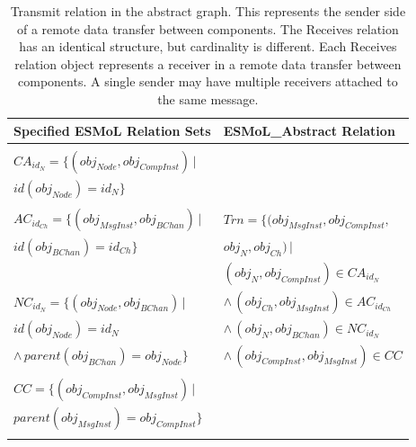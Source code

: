 \begin{table}
\centering

\begin{tabular}[width=0.5\columnwidth]{ | l | l | }
 \hline
 \textbf{Specified ESMoL Relation Sets} & \textbf{ESMoL\_Abstract Relation} \\
 \hline \hline
                                                                        & \\
 $CA_{id_N} = \{ (obj_{Node}, obj_{CompInst} ) \, |$                    & \\
 \hspace{1.7cm} $ id(obj_{Node}) = id_N \} $                            & \\
                                                                        & \\
 $AC_{id_{Ch}} = \{ (obj_{MsgInst}, obj_{BChan} ) \, |$          
   & 
$ Trn = \{(obj_{MsgInst}, obj_{CompInst}, $  \\
 \hspace{1.6cm} $id(obj_{BChan}) = id_{Ch} \} $                         & 
\hspace{1.3cm} $obj_{N}, obj_{Ch}) \, |$ \\
                                                                        &  
\hspace{0.8cm} $(obj_{N}, obj_{CompInst}) \in CA_{id_N}$ \\
 $NC_{id_N} = \{ (obj_{Node}, obj_{BChan}) \, | $                       & 
\hspace{0.5cm} $ \wedge \, (obj_{Ch}, obj_{MsgInst}) \in AC_{id_{Ch}}$ \\
 \hspace{1.35cm} $id(obj_{Node}) = id_N $                               &
\hspace{0.5cm} $ \wedge \, (obj_{N}, obj_{BChan}) \in NC_{id_N}$ \\ 
 \hspace{1cm} $ \wedge \, parent(obj_{BChan} ) = obj_{Node} \}$         &
\hspace{0.5cm} $ \wedge \, (obj_{CompInst}, obj_{MsgInst}) \in CC $ \\
                                                                        & \\
 $CC = \{ (obj_{CompInst}, obj_{MsgInst} ) \, | $                       & \\
 \hspace{0.7cm} $parent(obj_{MsgInst} ) = obj_{CompInst} \}$            & \\ 
                                                                        & \\
 \hline
\end{tabular}
	\caption{Transmit relation in the abstract graph.  This represents the
sender side of a remote data transfer between components. The Receives relation 
has an identical structure, but cardinality is different. Each Receives
relation object represents a receiver in a remote data transfer between
components. A single sender may have multiple receivers attached to the same
message.}
	\label{tab:transmit}
\end{table}

